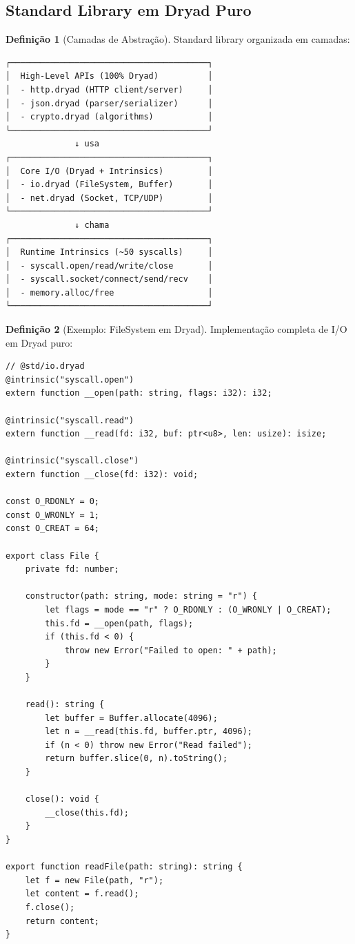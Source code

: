 \documentclass[12pt,a4paper]{article}
\theoremstyle{definition}
\newtheorem{definition}{Definição}[section]
\begin{document}
\subsection{Standard Library em Dryad Puro}

\begin{definition}[Camadas de Abstração]
Standard library organizada em camadas:

\begin{verbatim}
┌────────────────────────────────────────┐
│  High-Level APIs (100% Dryad)          │
│  - http.dryad (HTTP client/server)     │
│  - json.dryad (parser/serializer)      │
│  - crypto.dryad (algorithms)           │
└────────────────────────────────────────┘
              ↓ usa
┌────────────────────────────────────────┐
│  Core I/O (Dryad + Intrinsics)         │
│  - io.dryad (FileSystem, Buffer)       │
│  - net.dryad (Socket, TCP/UDP)         │
└────────────────────────────────────────┘
              ↓ chama
┌────────────────────────────────────────┐
│  Runtime Intrinsics (~50 syscalls)     │
│  - syscall.open/read/write/close       │
│  - syscall.socket/connect/send/recv    │
│  - memory.alloc/free                   │
└────────────────────────────────────────┘
\end{verbatim}
\end{definition}

\begin{definition}[Exemplo: FileSystem em Dryad]
Implementação completa de I/O em Dryad puro:

\begin{verbatim}
// @std/io.dryad
@intrinsic("syscall.open")
extern function __open(path: string, flags: i32): i32;

@intrinsic("syscall.read")
extern function __read(fd: i32, buf: ptr<u8>, len: usize): isize;

@intrinsic("syscall.close")
extern function __close(fd: i32): void;

const O_RDONLY = 0;
const O_WRONLY = 1;
const O_CREAT = 64;

export class File {
    private fd: number;
    
    constructor(path: string, mode: string = "r") {
        let flags = mode == "r" ? O_RDONLY : (O_WRONLY | O_CREAT);
        this.fd = __open(path, flags);
        if (this.fd < 0) {
            throw new Error("Failed to open: " + path);
        }
    }
    
    read(): string {
        let buffer = Buffer.allocate(4096);
        let n = __read(this.fd, buffer.ptr, 4096);
        if (n < 0) throw new Error("Read failed");
        return buffer.slice(0, n).toString();
    }
    
    close(): void {
        __close(this.fd);
    }
}

export function readFile(path: string): string {
    let f = new File(path, "r");
    let content = f.read();
    f.close();
    return content;
}
\end{verbatim}
\end{definition}
\end{document}

